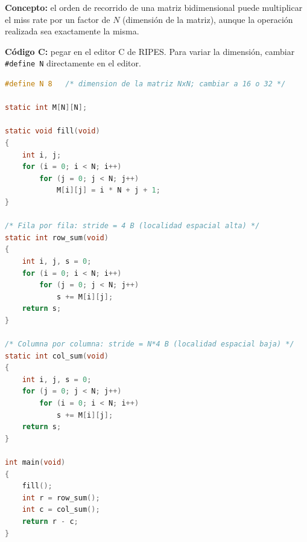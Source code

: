 \documentclass[12pt, a4paper]{article}
\begin{document}
\textbf{Concepto:} el orden de recorrido de una matriz bidimensional puede
multiplicar el miss rate por un factor de $N$ (dimensión de la matriz),
aunque la operación realizada sea exactamente la misma.

\textbf{Código C:} pegar en el editor C de RIPES. Para variar la dimensión,
cambiar \texttt{\#define N} directamente en el editor.

\begin{lstlisting}[language=C, caption={matrix\_row\_col.c --- pegar en editor C de RIPES}]
#define N 8   /* dimension de la matriz NxN; cambiar a 16 o 32 */

static int M[N][N];

static void fill(void)
{
    int i, j;
    for (i = 0; i < N; i++)
        for (j = 0; j < N; j++)
            M[i][j] = i * N + j + 1;
}

/* Fila por fila: stride = 4 B (localidad espacial alta) */
static int row_sum(void)
{
    int i, j, s = 0;
    for (i = 0; i < N; i++)
        for (j = 0; j < N; j++)
            s += M[i][j];
    return s;
}

/* Columna por columna: stride = N*4 B (localidad espacial baja) */
static int col_sum(void)
{
    int i, j, s = 0;
    for (j = 0; j < N; j++)
        for (i = 0; i < N; i++)
            s += M[i][j];
    return s;
}

int main(void)
{
    fill();
    int r = row_sum();
    int c = col_sum();
    return r - c;
}
\end{lstlisting}
\end{document}
